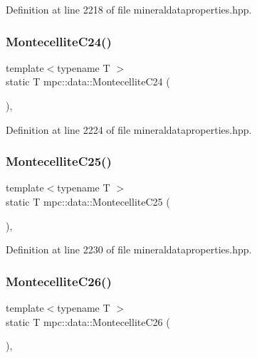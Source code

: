 Definition at line 2218 of file mineraldataproperties.\+hpp.

\mbox{\label{namespacempc_1_1data_a9d81c81a87e42c4877c00deae9bf5871}} 
\subsubsection{\texorpdfstring{Montecellite\+C24()}{MontecelliteC24()}}
{\footnotesize\ttfamily template$<$typename T $>$ \\
static T mpc\+::data\+::\+Montecellite\+C24 (\begin{DoxyParamCaption}{ }\end{DoxyParamCaption})\hspace{0.3cm}{\ttfamily [inline]}, {\ttfamily [static]}}



Definition at line 2224 of file mineraldataproperties.\+hpp.

\mbox{\label{namespacempc_1_1data_ad0e5198190c0696a536e407e350851e3}} 
\subsubsection{\texorpdfstring{Montecellite\+C25()}{MontecelliteC25()}}
{\footnotesize\ttfamily template$<$typename T $>$ \\
static T mpc\+::data\+::\+Montecellite\+C25 (\begin{DoxyParamCaption}{ }\end{DoxyParamCaption})\hspace{0.3cm}{\ttfamily [inline]}, {\ttfamily [static]}}



Definition at line 2230 of file mineraldataproperties.\+hpp.

\mbox{\label{namespacempc_1_1data_af9c89c66a4f4e019de095c8f75732015}} 
\subsubsection{\texorpdfstring{Montecellite\+C26()}{MontecelliteC26()}}
{\footnotesize\ttfamily template$<$typename T $>$ \\
static T mpc\+::data\+::\+Montecellite\+C26 (\begin{DoxyParamCaption}{ }\end{DoxyParamCaption})\hspace{0.3cm}{\ttfamily [inline]}, {\ttfamily [static]}}



